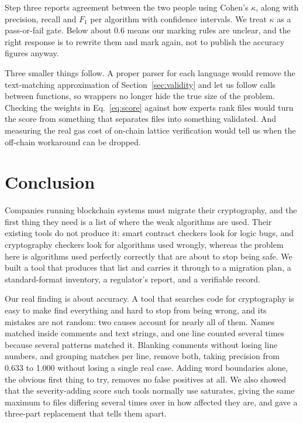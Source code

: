 \documentclass[runningheads]{llncs}
\begin{document}
Step three reports agreement between the two people using Cohen's $\kappa$,
along with precision, recall and $F_1$ per algorithm with confidence intervals.
We treat $\kappa$ as a pass-or-fail gate. Below about 0.6 means our marking
rules are unclear, and the right response is to rewrite them and mark again, not
to publish the accuracy figures anyway.

Three smaller things follow. A proper parser for each language would remove the
text-matching approximation of Section~\ref{sec:validity} and let us follow
calls between functions, so wrappers no longer hide the true size of the
problem. Checking the weights in Eq.~\ref{eq:score} against how experts rank
files would turn the score from something that separates files into something
validated. And measuring the real gas cost of on-chain lattice verification
would tell us when the off-chain workaround can be dropped.

\section{Conclusion}
\label{sec:conclusion}

Companies running blockchain systems must migrate their cryptography, and the
first thing they need is a list of where the weak algorithms are used. Their
existing tools do not produce it: smart contract checkers look for logic bugs,
and cryptography checkers look for algorithms used wrongly, whereas the problem
here is algorithms used perfectly correctly that are about to stop being safe.
We built a tool that produces that list and carries it through to a migration
plan, a standard-format inventory, a regulator's report, and a verifiable
record.

Our real finding is about accuracy. A tool that searches code for cryptography
is easy to make find everything and hard to stop from being wrong, and its
mistakes are not random: two causes account for nearly all of them. Names
matched inside comments and text strings, and one line counted several times
because several patterns matched it. Blanking comments without losing line
numbers, and grouping matches per line, remove both, taking precision from
0.633 to 1.000 without losing a single real case. Adding word boundaries alone,
the obvious first thing to try, removes no false positives at all. We also
showed that the severity-adding score such tools normally use saturates, giving
the same maximum to files differing several times over in how affected they are,
and gave a three-part replacement that tells them apart.
\end{document}
